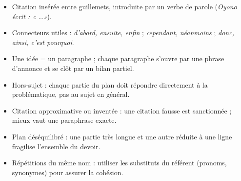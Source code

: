 \documentclass[11pt]{article}
\begin{document}
\begin{aretenir}
\begin{itemize}
\item Citation insérée entre guillemets, introduite par un verbe de parole (\emph{Oyono écrit : « \dots »}).
\item Connecteurs utiles : \emph{d'abord, ensuite, enfin} ; \emph{cependant, néanmoins} ; \emph{donc, ainsi, c'est pourquoi}.
\item Une idée = un paragraphe ; chaque paragraphe s'ouvre par une phrase d'annonce et se clôt par un bilan partiel.
\end{itemize}
\end{aretenir}

\begin{attention}
\begin{itemize}
\item Hors-sujet : chaque partie du plan doit répondre directement à la problématique, pas au sujet en général.
\item Citation approximative ou inventée : une citation fausse est sanctionnée ; mieux vaut une paraphrase exacte.
\item Plan déséquilibré : une partie très longue et une autre réduite à une ligne fragilise l'ensemble du devoir.
\item Répétitions du même nom : utiliser les substituts du référent (pronoms, synonymes) pour assurer la cohésion.
\end{itemize}
\end{attention}
\end{document}
